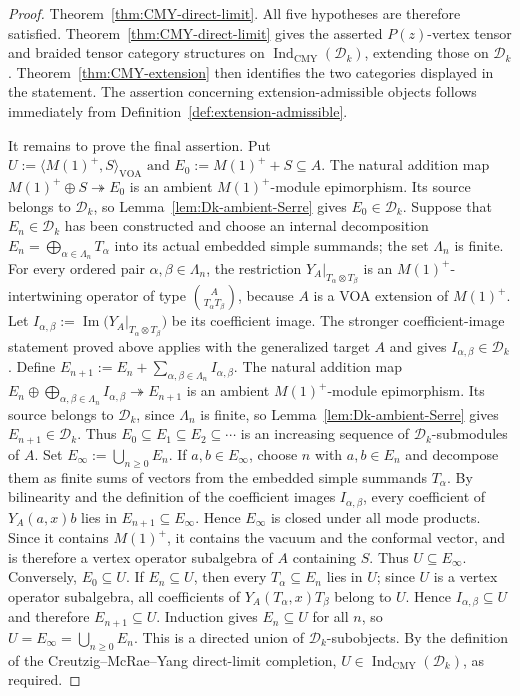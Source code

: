 \documentclass[10pt,a4paper]{amsart}
\numberwithin{equation}{section} \newtheorem{thm}{Theorem}[section] \newtheorem{lem}[thm]{Lemma} \newtheorem{ex}[thm]{Example} \newtheorem{prop}[thm]{Proposition} \newtheorem{cor}[thm]{Corollary} \newtheorem{defi}[thm]{Definition} \newtheorem{rmk}[thm]{Remark} \newtheorem{notation}[thm]{Notation}
\newcommand{\Dk}{\mathcal D_k}
\newcommand{\IndCMY}{\operatorname{Ind}_{\mathrm{CMY}}}
\begin{document}
\begin{proof}
Theorem~\ref{thm:CMY-direct-limit}. All five hypotheses are therefore satisfied. Theorem~\ref{thm:CMY-direct-limit} gives the asserted $P(z)$-vertex tensor and braided tensor category structures on $\IndCMY(\Dk)$, extending those on $\Dk$. Theorem~\ref{thm:CMY-extension} then identifies the two categories displayed in the statement. The assertion concerning extension-admissible objects follows immediately from Definition~\ref{def:extension-admissible}.

It remains to prove the final assertion. Put \(U:=\langle M(1)^+,S\rangle_{\mathrm{VOA}}\text{ and }E_0:=M(1)^++S\subseteq A\). The natural addition map \(M(1)^+\oplus S\twoheadrightarrow E_0\) is an ambient $M(1)^+$-module epimorphism. Its source belongs to $\Dk$, so Lemma~\ref{lem:Dk-ambient-Serre} gives $E_0\in\Dk$. Suppose that $E_n\in\Dk$ has been constructed and choose an internal decomposition \(E_n=\bigoplus_{\alpha\in\Lambda_n}T_\alpha\) into its actual embedded simple summands; the set $\Lambda_n$ is finite. For every ordered pair $\alpha,\beta\in\Lambda_n$, the restriction \(Y_A|_{T_\alpha\otimes T_\beta}\) is an $M(1)^+$-intertwining operator of type \(\binom{A}{T_\alpha T_\beta}\), because $A$ is a VOA extension of $M(1)^+$. Let \(I_{\alpha,\beta}:=\operatorname{Im}\bigl(Y_A|_{T_\alpha\otimes T_\beta}\bigr)\) be its coefficient image. The stronger coefficient-image statement proved above applies with the generalized target $A$ and gives $I_{\alpha,\beta}\in\Dk$. Define \(E_{n+1}:=E_n+\sum_{\alpha,\beta\in\Lambda_n}I_{\alpha,\beta}\). The natural addition map \(E_n\oplus\bigoplus_{\alpha,\beta\in\Lambda_n}I_{\alpha,\beta}\twoheadrightarrow E_{n+1}\) is an ambient $M(1)^+$-module epimorphism. Its source belongs to $\Dk$, since $\Lambda_n$ is finite, so Lemma~\ref{lem:Dk-ambient-Serre} gives $E_{n+1}\in\Dk$. Thus \(E_0\subseteq E_1\subseteq E_2\subseteq\cdots\) is an increasing sequence of $\Dk$-submodules of $A$. Set $E_\infty:=\bigcup_{n\ge0}E_n$. If $a,b\in E_\infty$, choose $n$ with $a,b\in E_n$ and decompose them as finite sums of vectors from the embedded simple summands $T_\alpha$. By bilinearity and the definition of the coefficient images $I_{\alpha,\beta}$, every coefficient of $Y_A(a,x)b$ lies in $E_{n+1}\subseteq E_\infty$. Hence $E_\infty$ is closed under all mode products. Since it contains $M(1)^+$, it contains the vacuum and the conformal vector, and is therefore a vertex operator subalgebra of $A$ containing $S$. Thus $U\subseteq E_\infty$. Conversely, $E_0\subseteq U$. If $E_n\subseteq U$, then every $T_\alpha\subseteq E_n$ lies in $U$; since $U$ is a vertex operator subalgebra, all coefficients of $Y_A(T_\alpha,x)T_\beta$ belong to $U$. Hence $I_{\alpha,\beta}\subseteq U$ and therefore $E_{n+1}\subseteq U$. Induction gives $E_n\subseteq U$ for all $n$, so \(U=E_\infty=\bigcup_{n\ge0}E_n\). This is a directed union of $\Dk$-subobjects. By the definition of the Creutzig--McRae--Yang direct-limit completion, $U\in\IndCMY(\Dk)$, as required.
\end{proof}
\end{document}
